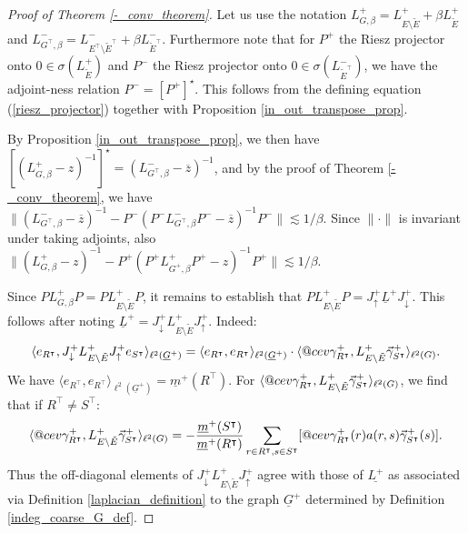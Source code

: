 \documentclass[reqno,12pt,letterpaper]{amsart}
\makeatletter
\numberwithin{equation}{section}
\newcommand{\Lin}{L^{-}}
\newcommand{\Lout}{L^{+}}
\DeclareRobustCommand{\cev}[1]{%
	\mathpalette\do@cev{#1}%
}
\newcommand{\do@cev}[2]{%
	\fix@cev{#1}{+}%
	\reflectbox{$\m@th#1\vec{\reflectbox{$\fix@cev{#1}{-}\m@th#1#2\fix@cev{#1}{+}$}}$}%
	\fix@cev{#1}{-}%
}
\newcommand{\fix@cev}[2]{%
	\ifx#1\displaystyle
	\mkern#23mu
	\else
	\ifx#1\textstyle
	\mkern#23mu
	\else
	\ifx#1\scriptstyle
	\mkern#22mu
	\else
	\mkern#22mu
	\fi
	\fi
	\fi
}
\newcommand{\1}{\mathds{1}}
\theoremstyle{definition}
\makeatother
\begin{document}
	\begin{proof}[Proof of Theorem \ref{-_conv_theorem}]
		Let us use the notation  $\Lout_{G, \beta} =  \Lout_{E \setminus \tilde{E}} +\beta \Lout_{\tilde{E}}$ and $\Lin_{G^\intercal, \beta} =  \Lin_{E^\intercal  \setminus \tilde{E}^\intercal } +\beta \Lin_{\tilde{E}^\intercal }$. Furthermore note that for $P^+$ the Riesz projector onto $0 \in \sigma(\Lout_{\tilde{E}})$
		and $P^-$ the Riesz projector onto $0 \in \sigma(\Lin_{\tilde{E}^\intercal})$, we have the adjoint-ness relation $P^- = [P^+]^\star$. This follows from the defining equation (\ref{riesz_projector}) together with Proposition 
		\ref{in_out_transpose_prop}.
		
By Proposition \ref{in_out_transpose_prop}, we then have $
	[(\Lout_{G, \beta} - z )^{-1}]^\star = (\Lin_{G^\intercal,\beta } - \overline{z})^{-1}$, and by the proof of Theorem \ref{-_conv_theorem}, we have
	$\|(\Lin_{G^\intercal,\beta } - \overline{z})^{-1} -  P^-  ( P^-  \Lin_{G^\intercal,\beta } P^- - \overline{z})^{-1}     P^-     \|  \lesssim 1/\beta$. Since $\|\cdot\|$ is invariant under taking adjoints, also $\|(\Lout_{G,\beta } - z)^{-1} -  P^+  ( P^+  \Lout_{G^+,\beta } P^+ - z)^{-1}     P^+     \|  \lesssim 1/\beta$.  



Since $P  \Lout_{G,\beta } P = P\Lout_{E \setminus \tilde{E}} P $, it remains to establish that
$P\Lout_{E \setminus \tilde{E}} P = J^+_{\uparrow} \underline{L}^+ J^+_{\downarrow}$. 	
This follows after noting $\underline{L}^+ = J^+_{\downarrow} \Lout_{E\setminus \tilde{E}}  J^+_\uparrow$. Indeed:
\begin{align}
\langle e_{R^\intercal}, J^+_{\downarrow} \Lout_{E\setminus \tilde{E}}  J^+_\uparrow e_{S^\intercal}\rangle_{\ell^2(\underline{G}^+)} = \langle e_{R^\intercal}, e_{R^\intercal}\rangle_{\ell^2(\underline{G}^+)}\cdot
\langle\cev{\gamma}^+_{R^\intercal},  \Lout_{E\setminus \tilde{E}} \vec{\gamma}^+_{S^\intercal} \rangle_{\ell^2(G)}.
\end{align}
We have $ \langle e_{R^\intercal}, e_{R^\intercal}\rangle_{\ell^2(\underline{G}^+)} =  \underline{m}^+(R^\intercal) $.  
For $\langle\cev{\gamma}^+_{R^\intercal},  \Lout_{E\setminus \tilde{E}} \vec{\gamma}^+_{S^\intercal} \rangle_{\ell^2(G)}$, we find that if $R^\intercal \neq S^\intercal$:
\begin{align}
	\langle\cev{\gamma}^+_{R^\intercal},  \Lout_{E\setminus \tilde{E}} \vec{\gamma}^+_{S^\intercal} \rangle_{\ell^2(G)} 
	= - 	\frac{\underline{m}^+(S^\intercal)}{\underline{m}^+(R^\intercal)}\sum\limits_{r \in R^\intercal, s \in S^\intercal} 
	[
	\cev{\gamma}^{+}_{R^\intercal}(r)
	a(r,s)
	\vec{\gamma}_{S^\intercal}^{+}(s)
	].
\end{align}
Thus the off-diagonal elements of $J^+_{\downarrow} \Lout_{E\setminus \tilde{E}}  J^+_\uparrow $ agree with those of $\underline{\Lout}$ as associated via Definition \ref{laplacian_definition} to the graph $\underline{G}^+$ determined by Definition \ref{indeg_coarse_G_def}.


\end{proof}
\end{document}
